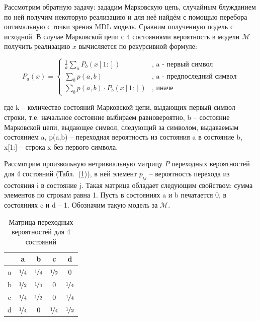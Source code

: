 \documentclass[12pt]{article}
\begin{document}
	Рассмотрим обратную задачу: зададим Марковскую цепь, случайным блужданием по ней получим некоторую реализацию и для неё найдём с помощью перебора оптимальную с точки зрения MDL модель. Сравним полученную подель с исходной. В случае Марковской цепи с 4 состояниями вероятность в модели $\mathcal{M}$ получить реализацию $x$ вычисляется по рекурсивной формуле:
	
	\begin{equation}
		P_a(x) =
		\begin{cases}
			\frac{1}{k}\sum_a P_b(x[1:]) & \text{, a - первый символ}\\
			\sum_b p(a,b)& \text{, a - предпоследний символ}\\
			\sum_b p(a,b)\cdot P_b(x[1:])& \text{, иначе}
		\end{cases}
	\end{equation}

	где k -- количество состояний Марковской цепи, выдающих первый символ строки, т.е. начальное состояние выбираем равновероятно, b -- состояние Марковской цепи, выдающее символ, следующий за символом, выдаваемым состоянием a, p(a,b) -- переходная вероятность из состояния a в состояние b, x[1:] -- строка x без первого символа.
	
	Рассмотрим произвольную нетривиальную матрицу $P$ переходных вероятностей для 4 состояний (Табл.~(\ref{table:matrix4})), в ней элемент $p_{ij}$ -- вероятность перехода из состояния i в состояние j. Такая матрица обладает следующим свойством: сумма элементов по строкам равна 1. Пусть в состояниях a и b печатается 0, в состояниях c и d -- 1. Обозначим такую модель за $\mathcal{M}$.
	
	
	
	\begin{table}[!h]
		\caption{Матрица переходных вероятностей для 4 состояний}
		\label{table:matrix4}
		\begin{center}
			\begin{tabular}{|c|c|c|c|c|}
				\hline
				 & a & b & c & d \\
				\hline
				a & $\nicefrac{1}{4}$ & $\nicefrac{1}{4}$ & $\nicefrac{1}{2}$ & 0\\
				\hline
				b & $\nicefrac{1}{2}$ & $\nicefrac{1}{4}$ & 0 & $\nicefrac{1}{4}$ \\
				\hline
				c & $\nicefrac{1}{4}$ & $\nicefrac{1}{2}$ & 0 & $\nicefrac{1}{4}$ \\
				\hline
				d & $\nicefrac{1}{4}$ & 0 & $\nicefrac{1}{4}$ & $\nicefrac{1}{2}$ \\
				\hline
			\end{tabular}
		\end{center}
	\end{table}
\end{document}
